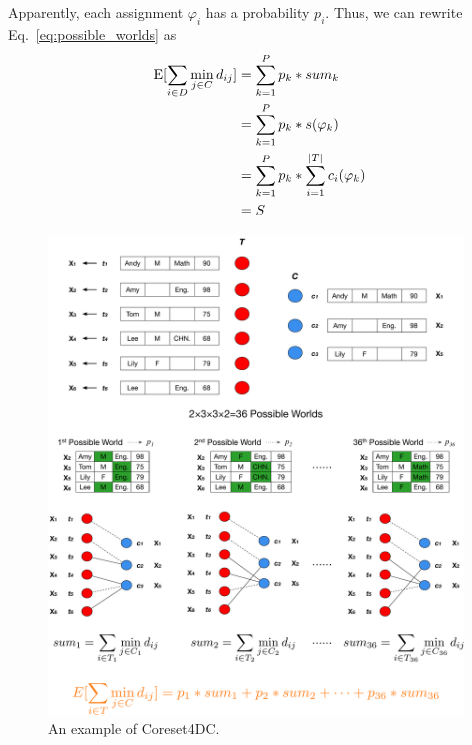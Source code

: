 Apparently, each assignment $\varphi_i$ has a probability $p_i$. Thus, we can rewrite Eq.~\ref{eq:possible_worlds} as 
\begin{equation}
		\begin{aligned}
		\mathrm{E}[\sum_{i\in D} \min_{j\in C} d_{ij}] & = \sum_{k = 1}^{P} p_{k} * sum_k \\
		& = \sum_{k = 1}^{P} p_{k} * s(\varphi_k) \\
		& = \sum_{k = 1}^{P} p_{k} * \sum_{i=1}^{|T|} c_i(\varphi_k) \\
		& = S \\
	\end{aligned}
\end{equation}


\begin{figure}[t]
	\centering
	\includegraphics[width=0.98\textwidth]{figs/example.pdf}
	\caption{An example of Coreset4DC.}
	\label{fig:frog}
\end{figure}
\fi


